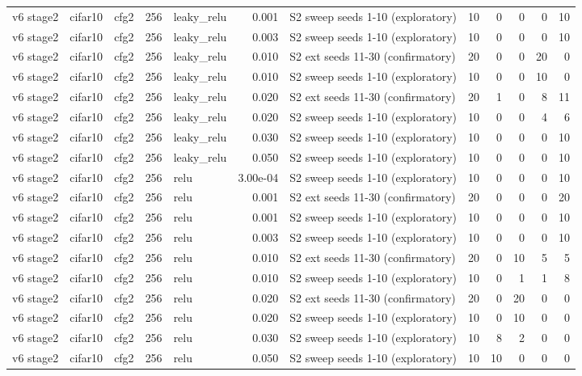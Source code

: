 \begin{table}[htbp]
{\begin{tabular}{@{}lllrlrlrrrrr@{}}
v6 stage2 & cifar10 & cfg2 & 256 & leaky\_relu & 0.001 & S2 sweep seeds 1-10 (exploratory) & 10 & 0 & 0 & 0 & 10 \\
v6 stage2 & cifar10 & cfg2 & 256 & leaky\_relu & 0.003 & S2 sweep seeds 1-10 (exploratory) & 10 & 0 & 0 & 0 & 10 \\
v6 stage2 & cifar10 & cfg2 & 256 & leaky\_relu & 0.010 & S2 ext seeds 11-30 (confirmatory) & 20 & 0 & 0 & 20 & 0 \\
v6 stage2 & cifar10 & cfg2 & 256 & leaky\_relu & 0.010 & S2 sweep seeds 1-10 (exploratory) & 10 & 0 & 0 & 10 & 0 \\
v6 stage2 & cifar10 & cfg2 & 256 & leaky\_relu & 0.020 & S2 ext seeds 11-30 (confirmatory) & 20 & 1 & 0 & 8 & 11 \\
v6 stage2 & cifar10 & cfg2 & 256 & leaky\_relu & 0.020 & S2 sweep seeds 1-10 (exploratory) & 10 & 0 & 0 & 4 & 6 \\
v6 stage2 & cifar10 & cfg2 & 256 & leaky\_relu & 0.030 & S2 sweep seeds 1-10 (exploratory) & 10 & 0 & 0 & 0 & 10 \\
v6 stage2 & cifar10 & cfg2 & 256 & leaky\_relu & 0.050 & S2 sweep seeds 1-10 (exploratory) & 10 & 0 & 0 & 0 & 10 \\
v6 stage2 & cifar10 & cfg2 & 256 & relu & 3.00e-04 & S2 sweep seeds 1-10 (exploratory) & 10 & 0 & 0 & 0 & 10 \\
v6 stage2 & cifar10 & cfg2 & 256 & relu & 0.001 & S2 ext seeds 11-30 (confirmatory) & 20 & 0 & 0 & 0 & 20 \\
v6 stage2 & cifar10 & cfg2 & 256 & relu & 0.001 & S2 sweep seeds 1-10 (exploratory) & 10 & 0 & 0 & 0 & 10 \\
v6 stage2 & cifar10 & cfg2 & 256 & relu & 0.003 & S2 sweep seeds 1-10 (exploratory) & 10 & 0 & 0 & 0 & 10 \\
v6 stage2 & cifar10 & cfg2 & 256 & relu & 0.010 & S2 ext seeds 11-30 (confirmatory) & 20 & 0 & 10 & 5 & 5 \\
v6 stage2 & cifar10 & cfg2 & 256 & relu & 0.010 & S2 sweep seeds 1-10 (exploratory) & 10 & 0 & 1 & 1 & 8 \\
v6 stage2 & cifar10 & cfg2 & 256 & relu & 0.020 & S2 ext seeds 11-30 (confirmatory) & 20 & 0 & 20 & 0 & 0 \\
v6 stage2 & cifar10 & cfg2 & 256 & relu & 0.020 & S2 sweep seeds 1-10 (exploratory) & 10 & 0 & 10 & 0 & 0 \\
v6 stage2 & cifar10 & cfg2 & 256 & relu & 0.030 & S2 sweep seeds 1-10 (exploratory) & 10 & 8 & 2 & 0 & 0 \\
v6 stage2 & cifar10 & cfg2 & 256 & relu & 0.050 & S2 sweep seeds 1-10 (exploratory) & 10 & 10 & 0 & 0 & 0 \\

\end{tabular}}
\end{table}
